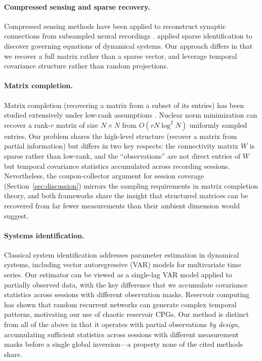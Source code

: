 \documentclass{article}
\begin{document}
\paragraph{Compressed sensing and sparse recovery.}
Compressed sensing methods have been applied to reconstruct synaptic connections from subsampled neural recordings \citep{candes2006robust}.
\citet{brunton2016discovering} applied sparse identification to discover governing equations of dynamical systems.
Our approach differs in that we recover a full matrix rather than a sparse vector, and leverage temporal covariance structure rather than random projections.

\paragraph{Matrix completion.}
Matrix completion (recovering a matrix from a subset of its entries) has been studied extensively under low-rank assumptions \citep{candes2009exact}.
Nuclear norm minimization can recover a rank-$r$ matrix of size $N \times N$ from $O(rN \log^2 N)$ uniformly sampled entries.
Our problem shares the high-level structure (recover a matrix from partial information) but differs in two key respects: the connectivity matrix $W$ is sparse rather than low-rank, and the ``observations'' are not direct entries of $W$ but temporal covariance statistics accumulated across recording sessions.
Nevertheless, the coupon-collector argument for session coverage (Section~\ref{sec:discussion}) mirrors the sampling requirements in matrix completion theory, and both frameworks share the insight that structured matrices can be recovered from far fewer measurements than their ambient dimension would suggest.

\paragraph{Systems identification.}
Classical system identification \citep{ljung1998system} addresses parameter estimation in dynamical systems, including vector autoregressive (VAR) models for multivariate time series.
Our estimator can be viewed as a single-lag VAR model applied to partially observed data, with the key difference that we accumulate covariance statistics across sessions with different observation masks.
Reservoir computing \citep{sussillo2009generating} has shown that random recurrent networks can generate complex temporal patterns, motivating our use of chaotic reservoir CPGs.
Our method is distinct from all of the above in that it operates with partial observations \emph{by design}, accumulating sufficient statistics across sessions with different measurement masks before a single global inversion---a property none of the cited methods share.
\end{document}
